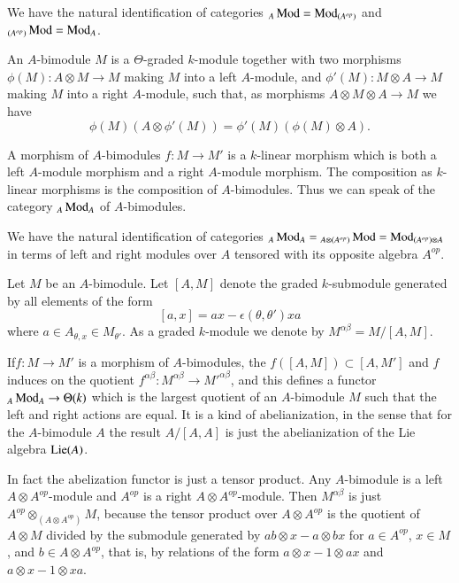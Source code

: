 We have the natural identification of categories
${}_{A}\operatorname{Mod}=\operatorname{Mod}_{(A^{op})}$ and ${}_{(A^{op})}\operatorname{Mod}=\operatorname{Mod}_{A}$. 

\begin{definition}\label{chap2-defi5.3}
An $A$-bimodule $M$ is a $\Theta$-graded $k$-module together with two
morphisms $\phi(M):A\otimes M\to M$ making $M$ into a left $A$-module,
and $\phi'(M):M\otimes A\to M$ making $M$ into a right $A$-module,
such that, as morphisms $A\otimes M\otimes A\to M$ we have
$$
\phi(M)(A\otimes \phi'(M))=\phi'(M)(\phi(M)\otimes A).
$$

A morphism of $A$-bimodules $f:M\to M'$ is a $k$-linear morphism which
is both a left $A$-module morphism and a right $A$-module
morphism. The composition as $k$-linear morphisms is the composition
of $A$-bimodules. Thus we can speak of the category ${}_{A}\operatorname{Mod}_{A}$
of $A$-bimodules.
\end{definition}

We have the natural identification of categories
${}_{A}\Mod_{A}={}_{A\otimes (A^{op})}\break\Mod=\Mod_{(A^{op})\otimes A}$
in terms of left and right modules over $A$ tensored with its opposite
algebra $A^{op}$.

\begin{definition}\label{chap2-defi5.4}
Let $M$ be an $A$-bimodule. Let $[A,M]$ denote the graded
$k$-submodule generated by all elements of the form
$$
[a,x]=ax-\epsilon(\theta,\theta')xa
$$
where $a\in A_{\theta,x}\in M_{\theta'}$. As a graded $k$-module we
denote by $M^{\alpha\beta}=M/[A,M]$. 
\end{definition}

If\pageoriginale $f:M\to M'$ is a morphism of $A$-bimodules, the
$f([A,M])\subset [A,M']$ and $f$ induces on the quotient
$f^{\alpha\beta}:M^{\alpha\beta}\to {M'}^{\alpha\beta}$, and this
defines a functor ${}_{A}\operatorname{Mod}_{A}\to \Theta(k)$ which is the largest
quotient of an $A$-bimodule $M$ such that the left and right actions
are equal. It is a kind of abelianization, in the sense that for the
$A$-bimodule $A$ the result $A/[A,A]$ is just the abelianization of
the Lie algebra $\operatorname{Lie}(A)$.

\begin{remark}\label{chap2-rem5.5}
In fact the abelization functor is just a tensor product. Any
$A$-bimodule is a left $A\otimes A^{op}$-module and $A^{op}$ is a
right $A\otimes A^{op}$-module. Then $M^{\alpha\beta}$ is just
$A^{op}\otimes_{(A\otimes A^{op})}M$, because the tensor product over
$A\otimes A^{op}$ is the quotient of $A\otimes M$ divided by the
submodule generated by $ab\otimes x-a\otimes bx$ for $a\in A^{op}$,
$x\in M$, and $b\in A\otimes A^{op}$, that is, by relations of the
form $a\otimes x-1\otimes ax$ and $a\otimes x-1\otimes xa$.
\end{remark}

